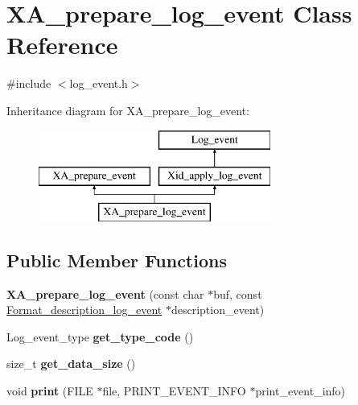 \hypertarget{classXA__prepare__log__event}{}\section{X\+A\+\_\+prepare\+\_\+log\+\_\+event Class Reference}
\label{classXA__prepare__log__event}


{\ttfamily \#include $<$log\+\_\+event.\+h$>$}

Inheritance diagram for X\+A\+\_\+prepare\+\_\+log\+\_\+event\+:\begin{figure}[H]
\begin{center}
\leavevmode
\includegraphics[height=3.000000cm]{classXA__prepare__log__event}
\end{center}
\end{figure}
\subsection*{Public Member Functions}
\begin{DoxyCompactItemize}
\item 
\mbox{\label{classXA__prepare__log__event_ae2553ee3cf2a5e32a134b6a7e0b5bb5a}} 
{\bfseries X\+A\+\_\+prepare\+\_\+log\+\_\+event} (const char $\ast$buf, const \mbox{\hyperlink{classFormat__description__log__event}{Format\+\_\+description\+\_\+log\+\_\+event}} $\ast$description\+\_\+event)
\item 
\mbox{\label{classXA__prepare__log__event_a65341d479330f8673da3bc0917ccea1e}} 
Log\+\_\+event\+\_\+type {\bfseries get\+\_\+type\+\_\+code} ()
\item 
\mbox{\label{classXA__prepare__log__event_a1882d416d8e77a885b3742bf00de32cd}} 
size\+\_\+t {\bfseries get\+\_\+data\+\_\+size} ()
\item 
\mbox{\label{classXA__prepare__log__event_a52dc59527730c0289961f338a67cb5b8}} 
void {\bfseries print} (F\+I\+LE $\ast$file, P\+R\+I\+N\+T\+\_\+\+E\+V\+E\+N\+T\+\_\+\+I\+N\+FO $\ast$print\+\_\+event\+\_\+info)
\end{DoxyCompactItemize}
